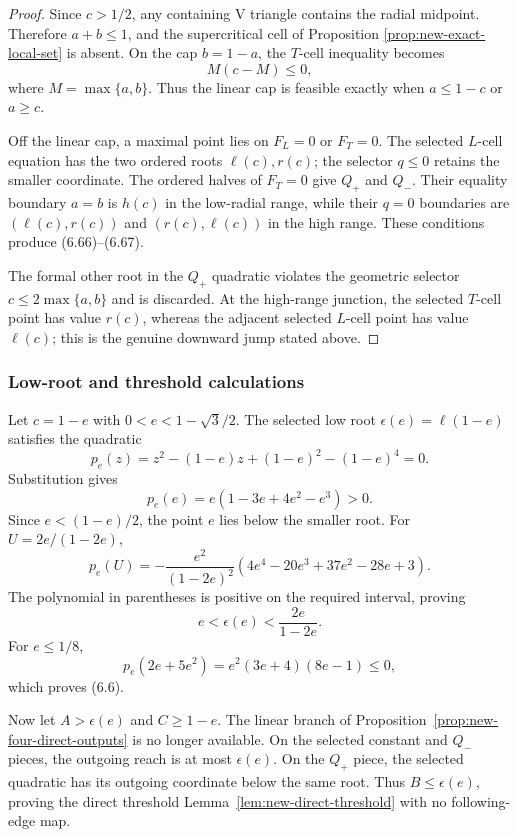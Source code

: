 \begin{proof}
Since $c>1/2$, any containing V triangle contains the radial midpoint.
Therefore $a+b\le1$, and the supercritical cell of Proposition
\ref{prop:new-exact-local-set} is absent.  On the cap $b=1-a$, the $T$-cell
inequality becomes
\[
 M(c-M)\le0,
\]
where $M=\max\{a,b\}$.  Thus the linear cap is feasible exactly when
$a\le1-c$ or $a\ge c$.

Off the linear cap, a maximal point lies on $F_L=0$ or $F_T=0$.  The selected
$L$-cell equation has the two ordered roots $\ell(c),r(c)$; the selector
$q\le0$ retains the smaller coordinate.  The ordered halves of $F_T=0$ give
$Q_+$ and $Q_-$.  Their equality boundary $a=b$ is $h(c)$ in the low-radial
range, while their $q=0$ boundaries are
$(\ell(c),r(c))$ and $(r(c),\ell(c))$ in the high range.  These conditions
produce (6.66)--(6.67).

The formal other root in the $Q_+$ quadratic violates the geometric selector
$c\le2\max\{a,b\}$ and is discarded.  At the high-range junction, the
selected $T$-cell point has value $r(c)$, whereas the adjacent selected
$L$-cell point has value $\ell(c)$; this is the genuine downward jump stated
above.
\end{proof}

\subsubsection{Low-root and threshold calculations}

Let $c=1-e$ with $0<e<1-\sqrt3/2$.  The selected low root
$\epsilon(e)=\ell(1-e)$ satisfies the quadratic
\[
 p_e(z)=z^2-(1-e)z+(1-e)^2-(1-e)^4=0.
 \tag{6.68}
\]
Substitution gives
\[
 p_e(e)=e(1-3e+4e^2-e^3)>0.
\]
Since $e<(1-e)/2$, the point $e$ lies below the smaller root.  For
$U=2e/(1-2e)$,
\[
 p_e(U)=
 -\frac{e^2}{(1-2e)^2}
 (4e^4-20e^3+37e^2-28e+3).
\]
The polynomial in parentheses is positive on the required interval, proving
\[
 e<\epsilon(e)<\frac{2e}{1-2e}.
\]
For $e\le1/8$,
\[
 p_e(2e+5e^2)=e^2(3e+4)(8e-1)\le0,
\]
which proves (6.6).

Now let $A>\epsilon(e)$ and $C\ge1-e$.  The linear branch of
Proposition~\ref{prop:new-four-direct-outputs} is no longer available.  On
the selected constant and $Q_-$ pieces, the outgoing reach is at most
$\epsilon(e)$.  On the $Q_+$ piece, the selected quadratic has its outgoing
coordinate below the same root.  Thus $B\le\epsilon(e)$, proving the direct
threshold Lemma~\ref{lem:new-direct-threshold} with no following-edge map.

